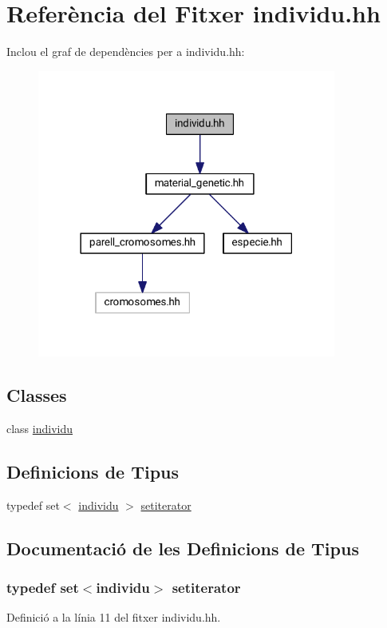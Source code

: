 \hypertarget{individu_8hh}{}\section{Referència del Fitxer individu.\+hh}
\label{individu_8hh}
Inclou el graf de dependències per a individu.\+hh\+:
\nopagebreak
\begin{figure}[H]
\begin{center}
\leavevmode
\includegraphics[width=278pt]{individu_8hh__incl}
\end{center}
\end{figure}
\subsection*{Classes}
\begin{DoxyCompactItemize}
\item 
class \hyperlink{classindividu}{individu}
\end{DoxyCompactItemize}
\subsection*{Definicions de Tipus}
\begin{DoxyCompactItemize}
\item 
typedef set$<$ \hyperlink{classindividu}{individu} $>$ \hyperlink{individu_8hh_a32dbccbf05588c8c12b0111d5c5c6eb3}{setiterator}
\end{DoxyCompactItemize}


\subsection{Documentació de les Definicions de Tipus}
\subsubsection[{\texorpdfstring{setiterator}{setiterator}}]{\setlength{\rightskip}{0pt plus 5cm}typedef set$<${\bf individu}$>$ {\bf setiterator}}\hypertarget{individu_8hh_a32dbccbf05588c8c12b0111d5c5c6eb3}{}\label{individu_8hh_a32dbccbf05588c8c12b0111d5c5c6eb3}


Definició a la línia 11 del fitxer individu.\+hh.

